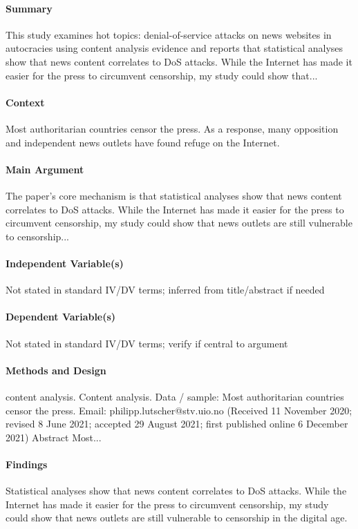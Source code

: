 \documentclass[12pt]{article}
\begin{document}
\paragraph{Summary} This study examines hot topics: denial-of-service attacks on news websites in autocracies using content analysis evidence and reports that statistical analyses show that news content correlates to DoS attacks. While the Internet has made it easier for the press to circumvent censorship, my study could show that...

\paragraph{Context} Most authoritarian countries censor the press. As a response, many opposition and independent news outlets have found refuge on the Internet.

\paragraph{Main Argument} The paper's core mechanism is that statistical analyses show that news content correlates to DoS attacks. While the Internet has made it easier for the press to circumvent censorship, my study could show that news outlets are still vulnerable to censorship...

\paragraph{Independent Variable(s)} Not stated in standard IV/DV terms; inferred from title/abstract if needed

\paragraph{Dependent Variable(s)} Not stated in standard IV/DV terms; verify if central to argument

\paragraph{Methods and Design} content analysis. Content analysis. Data / sample: Most authoritarian countries censor the press. Email: philipp.lutscher@stv.uio.no (Received 11 November 2020; revised 8 June 2021; accepted 29 August 2021; first published online 6 December 2021) Abstract Most...

\paragraph{Findings} Statistical analyses show that news content correlates to DoS attacks. While the Internet has made it easier for the press to circumvent censorship, my study could show that news outlets are still vulnerable to censorship in the digital age.
\end{document}
